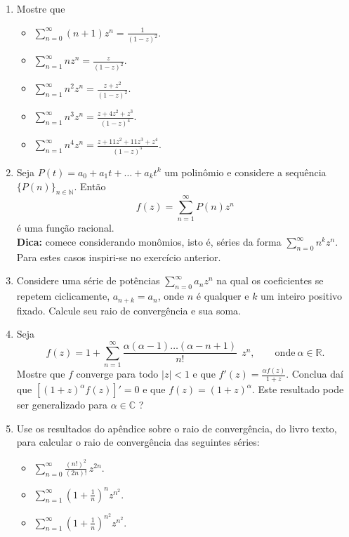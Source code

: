 \begin{enumerate}[leftmargin=*]
	\item Mostre que 
		\begin{itemize}
		\item $\displaystyle \sum_{n=0}^{\infty} (n+1)z^n =\frac{1}{(1-z)^2}$.
		\item $\displaystyle \sum_{n=1}^{\infty} nz^n =\frac{z}{(1-z)^2}$.
		\item $\displaystyle \sum_{n=1}^{\infty} n^2z^n =\frac{z+z^2}{(1-z)^2}$.
		\item $\displaystyle \sum_{n=1}^{\infty} n^3z^n =\frac{z+4z^2+z^3}{(1-z)^4}$.
		\item $\displaystyle \sum_{n=1}^{\infty} n^4z^n =\frac{z+11z^2+11z^3+z^4}{(1-z)^5}$.
		\end{itemize}
	
	\item Seja $P(t)=a_0+a_1t+\ldots+a_kt^k$ um polinômio e considere a sequência 
			$\{P(n)\}_{n\in\mathbb{N}}$. Então 
			$$
				f(z) = \sum_{n=1}^{\infty} P(n)z^n
			$$
		é uma função racional. \\
		{\bf Dica:} comece considerando monômios, isto é, séries da forma $\sum_{n=0}^{\infty}n^kz^n$.
		Para estes casos inspiri-se no exercício anterior.
		
	
	\item Considere uma série de potências $\sum_{n=0}^{\infty}a_nz^n$ 
		na qual os coeficientes se repetem ciclicamente, $a_{n+k}=a_{n}$,
		onde $n$ é qualquer e $k$ um inteiro positivo fixado. Calcule
		seu raio de convergência e sua soma.


	\item Seja 
	$$
		f(z) = 1+\sum_{n=1}^{\infty} \frac{\alpha(\alpha-1)\ldots(\alpha-n+1)}{n!}\ \ z^n,
		\qquad\text{onde}\ \alpha\in\mathbb{R}. 
	$$
	Mostre que $f$ converge para todo $|z|<1$ e que $f'(z)=\frac{\alpha f(z)}{1+z}$. 
	Conclua daí que $[(1+z)^{\alpha}f(z)]'=0$ e que $f(z)=(1+z)^{\alpha}$. 
	Este resultado pode ser generalizado para $\alpha\in\mathbb{C}$ ?
		


	\item Use os resultados do apêndice sobre o raio de convergência, do livro texto, 
		para calcular o raio de convergência das seguintes séries:
		\begin{itemize}
			\item $\displaystyle \sum_{n=0}^{\infty}\frac{(n!)^2}{(2n)!}\, z^{2n}$.
			\item $\displaystyle \sum_{n=1}^{\infty}\left( 1+ \frac{1}{n}\right)^{n} z^{n^2}$.
			\item $\displaystyle \sum_{n=1}^{\infty}\left( 1+ \frac{1}{n}\right)^{n^2} z^{n^2}$.
		\end{itemize}		 

	
\end{enumerate}